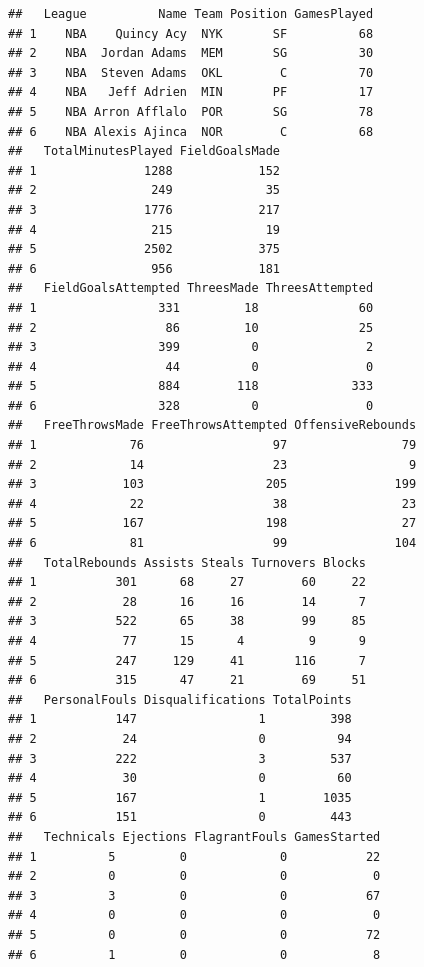 \documentclass[]{book}
\theoremstyle{definition}
\theoremstyle{definition}
\theoremstyle{remark}
\begin{document}
\begin{verbatim}
##   League          Name Team Position GamesPlayed
## 1    NBA    Quincy Acy  NYK       SF          68
## 2    NBA  Jordan Adams  MEM       SG          30
## 3    NBA  Steven Adams  OKL        C          70
## 4    NBA   Jeff Adrien  MIN       PF          17
## 5    NBA Arron Afflalo  POR       SG          78
## 6    NBA Alexis Ajinca  NOR        C          68
##   TotalMinutesPlayed FieldGoalsMade
## 1               1288            152
## 2                249             35
## 3               1776            217
## 4                215             19
## 5               2502            375
## 6                956            181
##   FieldGoalsAttempted ThreesMade ThreesAttempted
## 1                 331         18              60
## 2                  86         10              25
## 3                 399          0               2
## 4                  44          0               0
## 5                 884        118             333
## 6                 328          0               0
##   FreeThrowsMade FreeThrowsAttempted OffensiveRebounds
## 1             76                  97                79
## 2             14                  23                 9
## 3            103                 205               199
## 4             22                  38                23
## 5            167                 198                27
## 6             81                  99               104
##   TotalRebounds Assists Steals Turnovers Blocks
## 1           301      68     27        60     22
## 2            28      16     16        14      7
## 3           522      65     38        99     85
## 4            77      15      4         9      9
## 5           247     129     41       116      7
## 6           315      47     21        69     51
##   PersonalFouls Disqualifications TotalPoints
## 1           147                 1         398
## 2            24                 0          94
## 3           222                 3         537
## 4            30                 0          60
## 5           167                 1        1035
## 6           151                 0         443
##   Technicals Ejections FlagrantFouls GamesStarted
## 1          5         0             0           22
## 2          0         0             0            0
## 3          3         0             0           67
## 4          0         0             0            0
## 5          0         0             0           72
## 6          1         0             0            8
\end{verbatim}
\end{document}
